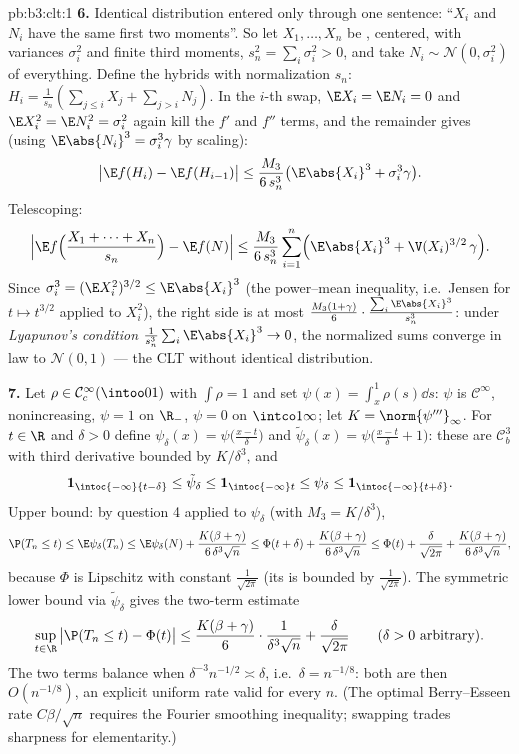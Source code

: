 \begin{solution}{pb:b3:clt:1}
\textbf{6.} Identical distribution entered only through one
sentence: ``$X_i$ and $N_i$ have the same first two
moments''. So let $X_1, \dots, X_n$ be ,
centered, with variances $\sigma_i^2$ and finite third
moments, $s_n^2 = \sum_i\sigma_i^2 > 0$, and take $N_i \sim
\mathcal N(0, \sigma_i^2)$  of everything.
Define the hybrids with normalization $s_n$: $H_i =
\frac1{s_n}(\sum_{j\leq i}X_j + \sum_{j>i}N_j)$. In the
$i$-th swap, $\E X_i = \E N_i = 0$ and $\E X_i^2 = \E N_i^2
= \sigma_i^2$ again kill the $f'$ and $f''$ terms, and the
remainder gives (using $\E\abs{N_i}^3 = \sigma_i^3\gamma$ by
scaling):
\[
\bigl|\E f(H_i) - \E f(H_{i-1})\bigr| \leq
\frac{M_3}{6\,s_n^3}\bigl(\E\abs{X_i}^3 +
\sigma_i^3\gamma\bigr) .
\]
Telescoping:
\[
\Bigl|\E f\Bigl(\frac{X_1 + \dots + X_n}{s_n}\Bigr) -
\E f(N)\Bigr| \leq \frac{M_3}{6\,s_n^3}\sum_{i=1}^n
\Bigl(\E\abs{X_i}^3 + \V(X_i)^{3/2}\,\gamma\Bigr) .
\]
Since $\sigma_i^3 = (\E X_i^2)^{3/2} \leq \E\abs{X_i}^3$
(the power--mean inequality, i.e.\ Jensen for $t \mapsto
t^{3/2}$ applied to $X_i^2$), the right side is at most
$\frac{M_3(1 + \gamma)}{6}\cdot
\frac{\sum_i\E\abs{X_i}^3}{s_n^3}$: under \emph{Lyapunov's
condition} $\frac1{s_n^3}\sum_i\E\abs{X_i}^3 \to 0$, the
normalized sums converge in law to $\mathcal N(0,1)$ ---
the CLT without identical distribution.

\textbf{7.} Let $\rho \in \mathcal C^\infty_c(\intoo01)$
with $\int\rho = 1$ and set $\psi(x) = \int_x^1\rho(s)\dd
s$: $\psi$ is $\mathcal C^\infty$, nonincreasing, $\psi = 1$
on $\R_-$, $\psi = 0$ on $\intco1\infty$; let $K =
\norm{\psi'''}_\infty$. For $t \in \R$ and $\delta > 0$
define $\psi_\delta(x) = \psi\bigl(\frac{x - t}\delta\bigr)$
and $\tilde\psi_\delta(x) = \psi\bigl(\frac{x - t}\delta +
1\bigr)$: these are $\mathcal C^3_b$ with third derivative
bounded by $K/\delta^3$, and
\[
\mathbf 1_{\intoc{-\infty}{t-\delta}} \leq
\tilde\psi_\delta \leq \mathbf 1_{\intoc{-\infty}t} \leq
\psi_\delta \leq \mathbf 1_{\intoc{-\infty}{t+\delta}} .
\]
Upper bound: by question 4 applied to $\psi_\delta$ (with
$M_3 = K/\delta^3$),
\[
\P(T_n \leq t) \leq \E\psi_\delta(T_n) \leq
\E\psi_\delta(N) + \frac{K(\beta +
\gamma)}{6\,\delta^3\sqrt n}
\leq \Phi(t + \delta) + \frac{K(\beta +
\gamma)}{6\,\delta^3\sqrt n}
\leq \Phi(t) + \frac{\delta}{\sqrt{2\pi}} +
\frac{K(\beta + \gamma)}{6\,\delta^3\sqrt n},
\]
because $\Phi$ is Lipschitz with constant
$\frac1{\sqrt{2\pi}}$ (its  is bounded by
$\frac1{\sqrt{2\pi}}$). The symmetric lower bound via
$\tilde\psi_\delta$ gives the two-term estimate
\[
\sup_{t\in\R}\,\bigl|\P(T_n \leq t) - \Phi(t)\bigr| \leq
\frac{K(\beta + \gamma)}{6}\cdot\frac{1}{\delta^3\sqrt n} +
\frac{\delta}{\sqrt{2\pi}}
\qquad(\delta > 0\ \text{arbitrary}).
\]
The two terms balance when $\delta^{-3}n^{-1/2} \asymp
\delta$, i.e.\ $\delta = n^{-1/8}$: both are then
$O(n^{-1/8})$, an explicit uniform rate valid for every
$n$. (The optimal Berry--Esseen rate $C\beta/\sqrt n$
requires the Fourier smoothing inequality; swapping trades
sharpness for  elementarity.)


\end{solution}
